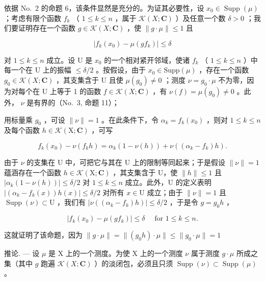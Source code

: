 依据 No.~2 的命题 6，该条件显然是充分的。为证其必要性，设 \(x_0 \in \operatorname{Supp}(\mu)\) ；考虑有限个函数 \(f_k\) （ \(1 \leqslant k \leqslant n\) ，属于 \(\mathcal{K}(X; \mathbf{C})\) ）及任意一个数 \(\delta > 0\) ；我们要证明存在一个函数 \(g \in \mathcal{K}(X; \mathbf{C})\) ，使 \(\| g \cdot \mu \| \leqslant 1\) 且

\[
\left| f _ {k} \left(x _ {0}\right) - \mu \left(g f _ {k}\right) \right| \leqslant \delta
\]

对 \(1 \leqslant k \leqslant n\) 成立。设 U 是 \(x_0\) 的一个相对紧开邻域，使诸 \(f_k\) （ \(1 \leqslant k \leqslant n\) ）中每一个在 U 上的振幅 \(\leqslant \delta/2\) 。按假设，由于 \(x_0 \in \text{Supp}(\mu)\) ，存在一个函数 \(g_0 \in \mathcal{K}(X; \mathbf{C})\) ，其支集含于 U 且使 \(\mu(g_0) \neq 0\) ；测度 \(\nu = g_0 \cdot \mu\) 不为零，因为对每个在 U 上等于 1 的函数 \(f \in \mathcal{K}(X; \mathbf{C})\) ，有 \(\nu(f) = \mu(g_0) \neq 0\) 。此外， \(\nu\) 是有界的（No.~3, 命题 11）；

用标量乘 \(g_{0}\) ，可设 \(\|\nu\|=1\) 。在此条件下，令 \(\alpha_{k}=f_{k}(x_{0})\) ，则对 \(1\leqslant k\leqslant n\) 及每个函数 \(h\in\mathcal{K}(\mathrm{X};\mathbf{C})\) ，可写

\[
f _ {k} (x _ {0}) - \nu (f _ {k} h) = \alpha_ {k} (1 - \nu (h)) + \nu ((\alpha_ {k} - f _ {k}) h).
\]

由于 \(\nu\) 的支集在 U 中，可把它与其在 U 上的限制等同起来；于是假设 \(\| \nu \| = 1\) 蕴涵存在一个函数 \(h \in \mathcal{K}(\mathrm{X};\mathbf{C})\) ，其支集含于 U，使 \(\| h \| \leqslant 1\) 且 \(|\alpha_{k}(1 - \nu (h))| \leqslant \delta / 2\) 对 \(1 \leqslant k \leqslant n\) 成立。此外，U 的定义表明 \(|(\alpha_{k} - f_{k}(x))h(x)| \leqslant \delta / 2\) 对所有 \(x \in \mathrm{U}\) 成立；由于 \(\| \nu \| = 1\) 且 \(\operatorname{Supp}(\nu) \subset \mathrm{U}\) ，我们有 \(|\nu ((\alpha_{k} - f_{k})h)| \leqslant \delta / 2\) ，于是令 \(g = g_0h\) ，

\[
\left| f _ {k} \left(x _ {0}\right) - \mu \left(g f _ {k}\right) \right| \leqslant \delta \quad \text { for } 1 \leqslant k \leqslant n.
\]

这就证明了该命题，因为 \(\| g\cdot \mu \| = \| (g_0h)\cdot \mu \| \leqslant \| g_0\cdot \mu \| = 1\)

推论. --- 设 \(\mu\) 是 X 上的一个测度。为使 X 上的一个测度 \(\nu\) 属于测度 \(g \cdot \mu\) 所成之集（其中 \(g\) 跑遍 \(\mathcal{K}(X; \mathbf{C})\) ）的淡闭包，必须且只须 \(\operatorname{Supp}(\nu) \subset \operatorname{Supp}(\mu)\) 。

